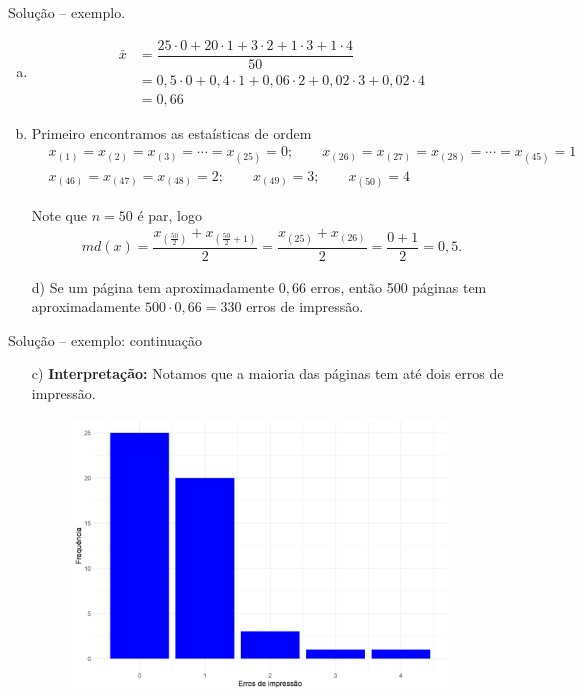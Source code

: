 \documentclass[8pt]{beamer}
\begin{document}
\begin{frame}{Solução -- exemplo.}
 \begin{enumerate}[a)]
  \item 
  \begin{align*}
   \bar{x} &=\dfrac{ 25 \cdot 0 + 20 \cdot 1 + 3 \cdot 2 + 1 \cdot 3 + 1 \cdot 4}{50}\\
   &= 0,5 \cdot 0 + 0,4 \cdot 1 + 0,06 \cdot 2 + 0,02 \cdot 3 + 0,02 \cdot 4\\
   &=0,66
  \end{align*}

  \item Primeiro encontramos as estaísticas de ordem
  \begin{align*}
   &x_{(1)} = x_{(2)} = x_{(3)} = \cdots = x_{(25)} = 0; \qquad x_{(26)} = x_{(27)} = x_{(28)} =  \cdots = x_{(45)} = 1\\
   &x_{(46)} = x_{(47)} = x_{(48)}  = 2; \qquad x_{(49)} = 3; \qquad x_{(50)} = 4
  \end{align*}

  Note que $n=50$ é par, logo 
  \begin{align*}
   md(x) =\dfrac{ x_{\left( \frac{50}{2} \right)}+x_{\left( \frac{50}{2} +1\right)}}{2} =\dfrac{ x_{(25)}+x_{(26)}}{2} = \dfrac{0+1}{2} = 0,5.
  \end{align*}
  
  \item[d)] Se um página tem aproximadamente $0,66$ erros, então 500 páginas tem aproximadamente $500 \cdot 0,66 = 330$ erros de impressão.
 \end{enumerate}

\end{frame}

\begin{frame}{Solução -- exemplo: continuação}
\begin{enumerate}[a)]
 \item[c)] \textbf{Interpretação:} Notamos que a maioria das páginas tem até dois erros de impressão.
 
 \begin{figure}
  \centering
  \includegraphics[width=10cm]{erros_livro.png}
 \end{figure}

\end{enumerate}
\end{frame}
\end{document}
